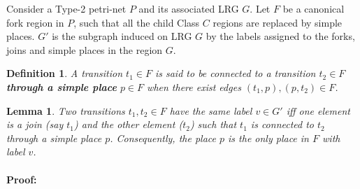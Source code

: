 \documentclass[12pt,a4paper]{article}
\newtheorem{lemma}{Lemma}
\newtheorem{definition}{Definition}
\begin{document}
Consider a Type-2 petri-net $P$ and its associated LRG $G$. Let $F$ be
a canonical fork region in $P$, such that all the child Class $C$
regions are replaced by simple places. $G'$ is the subgraph induced on
LRG $G$ by the labels assigned to the forks, joins and simple places
in the region $G$.

\begin{definition}

A transition $t_1\in F$ is said to be connected to a transition
$t_2\in F$ {\bf through a simple place} $p \in F$ when there exist
edges $(t_1,p),(p,t_2) \in F$.

\end{definition}

\begin{lemma}

Two transitions $t_1, t_2 \in F$ have the same label $v \in G'$ iff
one element is a join (say $t_1$) and the other element ($t_2$) such
that $t_1$ is connected to $t_2$ through a simple place $p$.
Consequently, the place $p$ is the only place in $F$ with label $v$.

\end{lemma}

\paragraph{Proof:}
\end{document}
